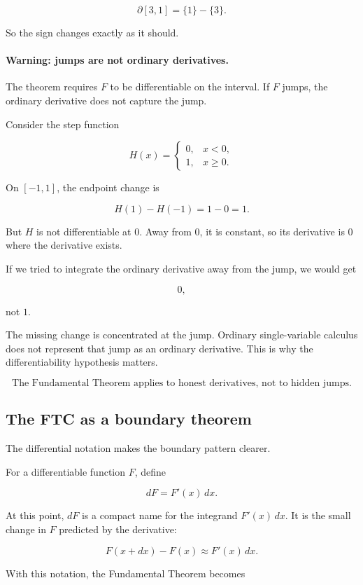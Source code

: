 \[
\partial[3,1]=\{1\}-\{3\}.
\]

So the sign changes exactly as it should.

\paragraph{Warning: jumps are not ordinary derivatives.}
The theorem requires \(F\) to be differentiable on the interval.  If \(F\) jumps, the
ordinary derivative does not capture the jump.

Consider the step function

\[
H(x)=
\begin{cases}
0, & x<0,\\
1, & x\ge0.
\end{cases}
\]

On \([-1,1]\), the endpoint change is

\[
H(1)-H(-1)=1-0=1.
\]

But \(H\) is not differentiable at \(0\).  Away from \(0\), it is constant, so its derivative
is \(0\) where the derivative exists.

If we tried to integrate the ordinary derivative away from the jump, we would get

\[
0,
\]

not \(1\).

The missing change is concentrated at the jump.  Ordinary single-variable calculus does
not represent that jump as an ordinary derivative.  This is why the differentiability
hypothesis matters.

\[
\boxed{
\text{The Fundamental Theorem applies to honest derivatives, not to hidden jumps.}
}
\]

\subsection{The FTC as a boundary theorem}
\label{subsec:ftc-as-boundary-theorem}

The differential notation makes the boundary pattern clearer.

For a differentiable function \(F\), define

\[
\boxed{
dF=F'(x)\,dx.
}
\]

At this point, \(dF\) is a compact name for the integrand \(F'(x)\,dx\).  It is the
small change in \(F\) predicted by the derivative:

\[
F(x+dx)-F(x)\approx F'(x)\,dx.
\]

With this notation, the Fundamental Theorem becomes

